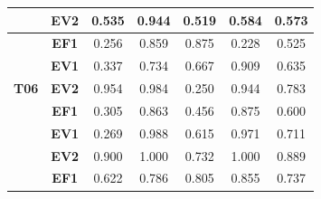 \begin{table}[htbp]
\begin{tabular}{|ccccccc|}
		\rowcolor[HTML]{F2F2F2} 
		\multicolumn{1}{|c|}{\multirow{-3}{*}{\cellcolor[HTML]{F2F2F2}\textbf{T05}}} & \multicolumn{1}{c|}{\cellcolor[HTML]{F2F2F2}\textbf{EV2}} & \multicolumn{1}{c|}{\cellcolor[HTML]{F2F2F2}0.535} & \multicolumn{1}{c|}{\cellcolor[HTML]{F2F2F2}0.944} & \multicolumn{1}{c|}{\cellcolor[HTML]{F2F2F2}0.519} & \multicolumn{1}{c|}{\cellcolor[HTML]{F2F2F2}0.584} & 0.573 \\ \hline
		\multicolumn{1}{|c|}{\cellcolor[HTML]{F2F2F2}} & \multicolumn{1}{c|}{\textbf{EF1}} & \multicolumn{1}{c|}{0.256} & \multicolumn{1}{c|}{0.859} & \multicolumn{1}{c|}{0.875} & \multicolumn{1}{c|}{0.228} & 0.525 \\ \cline{2-7} 
		\rowcolor[HTML]{F2F2F2} 
		\multicolumn{1}{|c|}{\cellcolor[HTML]{F2F2F2}} & \multicolumn{1}{c|}{\cellcolor[HTML]{F2F2F2}\textbf{EV1}} & \multicolumn{1}{c|}{\cellcolor[HTML]{F2F2F2}0.337} & \multicolumn{1}{c|}{\cellcolor[HTML]{F2F2F2}0.734} & \multicolumn{1}{c|}{\cellcolor[HTML]{F2F2F2}0.667} & \multicolumn{1}{c|}{\cellcolor[HTML]{F2F2F2}0.909} & 0.635 \\ \cline{2-7} 
		\multicolumn{1}{|c|}{\multirow{-3}{*}{\cellcolor[HTML]{F2F2F2}\textbf{T06}}} & \multicolumn{1}{c|}{\textbf{EV2}} & \multicolumn{1}{c|}{0.954} & \multicolumn{1}{c|}{0.984} & \multicolumn{1}{c|}{0.250} & \multicolumn{1}{c|}{0.944} & 0.783 \\ \hline
		\rowcolor[HTML]{F2F2F2} 
		\multicolumn{1}{|c|}{\cellcolor[HTML]{F2F2F2}} & \multicolumn{1}{c|}{\cellcolor[HTML]{F2F2F2}\textbf{EF1}} & \multicolumn{1}{c|}{\cellcolor[HTML]{F2F2F2}0.305} & \multicolumn{1}{c|}{\cellcolor[HTML]{F2F2F2}0.863} & \multicolumn{1}{c|}{\cellcolor[HTML]{F2F2F2}0.456} & \multicolumn{1}{c|}{\cellcolor[HTML]{F2F2F2}0.875} & 0.600 \\ \cline{2-7} 
		\multicolumn{1}{|c|}{\cellcolor[HTML]{F2F2F2}} & \multicolumn{1}{c|}{\textbf{EV1}} & \multicolumn{1}{c|}{0.269} & \multicolumn{1}{c|}{0.988} & \multicolumn{1}{c|}{0.615} & \multicolumn{1}{c|}{0.971} & 0.711 \\ \cline{2-7} 
		\rowcolor[HTML]{F2F2F2} 
		\multicolumn{1}{|c|}{\multirow{-3}{*}{\cellcolor[HTML]{F2F2F2}\textbf{T08}}} & \multicolumn{1}{c|}{\cellcolor[HTML]{F2F2F2}\textbf{EV2}} & \multicolumn{1}{c|}{\cellcolor[HTML]{F2F2F2}0.900} & \multicolumn{1}{c|}{\cellcolor[HTML]{F2F2F2}1.000} & \multicolumn{1}{c|}{\cellcolor[HTML]{F2F2F2}0.732} & \multicolumn{1}{c|}{\cellcolor[HTML]{F2F2F2}1.000} & 0.889 \\ \hline
		\multicolumn{1}{|c|}{\cellcolor[HTML]{F2F2F2}} & \multicolumn{1}{c|}{\textbf{EF1}} & \multicolumn{1}{c|}{0.622} & \multicolumn{1}{c|}{0.786} & \multicolumn{1}{c|}{0.805} & \multicolumn{1}{c|}{0.855} & 0.737 \\ \cline{2-7} 

\end{tabular}
\end{table}
